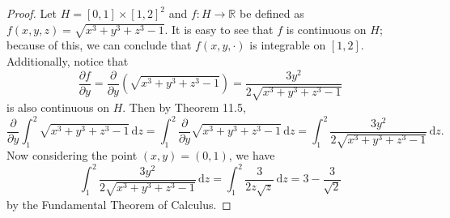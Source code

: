 \documentclass[ 12pt ]{article}
\begin{document}
\begin{enumerate}
		\begin{proof}
			Let $H = [0, 1] \times [1, 2]^2$ and $f : H \to \mathbb{R}$ be defined as $f(x, y, z) = \sqrt{x^3 + y^3 + z^3 - 1}$. It is easy to see that $f$ is continuous on $H$; because
			of this, we can conclude that $f(x, y, \cdot)$ is integrable on $[1, 2]$. Additionally, notice that $$\frac{\partial f}{\partial y} = \frac{\partial}{\partial y}\left (
			\sqrt{x^3 + y^3 + z^3 - 1} \right ) = \frac{3y^2}{2\sqrt{x^3 + y^3 + z^3 - 1}}$$ is also continuous on $H$. Then by Theorem 11.5, $$\frac{\partial}{\partial y} \int_1^2
			\sqrt{x^3 + y^3 + z^3 - 1}\, \mathrm{d}z = \int_1^2 \frac{\partial}{\partial y} \sqrt{x^3 + y^3 + z^3 - 1}\, \mathrm{d}z = \int_1^2 \frac{3y^2}{2\sqrt{x^3 + y^3 + z^3 - 1}}
			\, \mathrm{d}z.$$ Now considering the point $(x, y) = (0, 1)$, we have $$\int_1^2 \frac{3y^2}{2\sqrt{x^3 + y^3 + z^3 - 1}}\, \mathrm{d}z = \int_1^2 \frac{3}{2z\sqrt{z}}
			\, \mathrm{d}z = 3 - \frac{3}{\sqrt{2}}$$ by the Fundamental Theorem of Calculus.
		\end{proof}

\end{enumerate}
\end{document}
